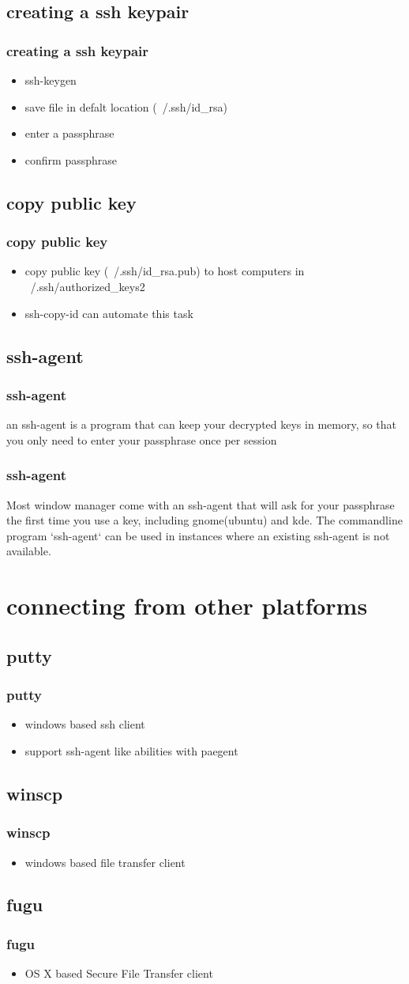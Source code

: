 \documentclass[hyperref={pdfpagelabels=false}]{beamer}
\begin{document}
\subsection{creating a ssh keypair}
\frame
{
    \frametitle{creating a ssh keypair}
    \begin{itemize}
    \item{ssh-keygen}
    \item{save file in defalt location (~/.ssh/id\_rsa)}
    \item{enter a passphrase}
    \item{confirm passphrase}
    \end{itemize}
}
\subsection{copy public key}
\frame
{
    \frametitle{copy public key}
    \begin{itemize}
    \item{copy public key (~/.ssh/id\_rsa.pub) to host computers in ~/.ssh/authorized\_keys2}
    \item{ssh-copy-id can automate this task}
    \end{itemize}
}
\subsection{ssh-agent}
\frame
{
    \frametitle{ssh-agent}
    an ssh-agent is a program that can keep your decrypted keys in memory, so that you only need to enter your passphrase once per session
}
\frame
{
    \frametitle{ssh-agent}
    Most window manager come with an ssh-agent that will ask for your passphrase the first time you use a key, including gnome(ubuntu) and kde.  The commandline program `ssh-agent` can be used in instances where an existing ssh-agent is not available.
}
\section{connecting from other platforms}
\subsection{putty}
\frame
{
    \frametitle{putty}
    \begin{itemize}
    \item{windows based ssh client}
    \item{support ssh-agent like abilities with paegent}
    \end{itemize}
}
\subsection{winscp}
\frame
{
    \frametitle{winscp}
    \begin{itemize}
    \item{windows based file transfer client}
    \end{itemize}
}
\subsection{fugu}
\frame
{
    \frametitle{fugu}
    \begin{itemize}
    \item{OS X based Secure File Transfer client}
    \end{itemize}
}
\end{document}
